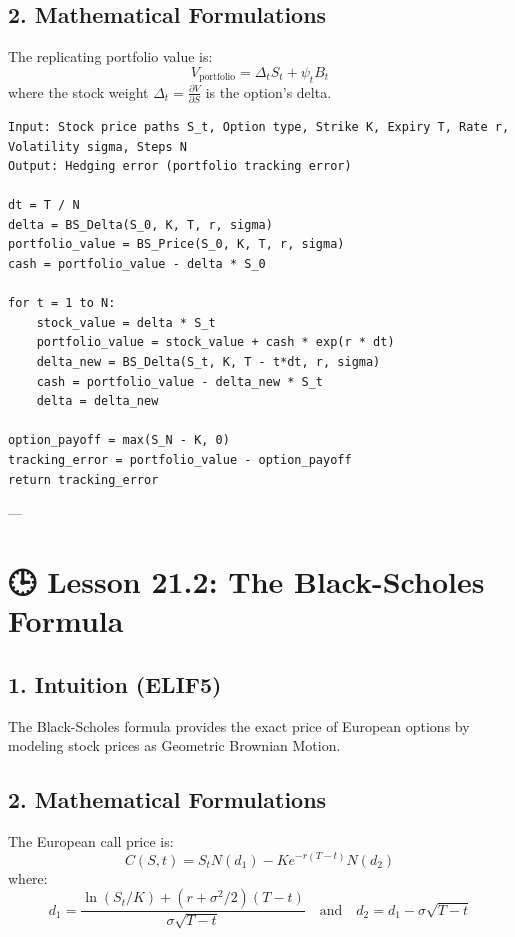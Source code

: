 \documentclass[11pt,oneside]{book}
\begin{document}
\subsection{2. Mathematical Formulations}
The replicating portfolio value is:
$$V_{\text{portfolio}} = \Delta_t S_t + \psi_t B_t$$
where the stock weight $\Delta_t = \frac{\partial V}{\partial S}$ is the option's delta.

\begin{tcolorbox}[colback=white,colframe=black,boxrule=0.6pt,arc=0mm,title=Delta Hedging Strategy]
\begin{verbatim}
Input: Stock price paths S_t, Option type, Strike K, Expiry T, Rate r, Volatility sigma, Steps N
Output: Hedging error (portfolio tracking error)

dt = T / N
delta = BS_Delta(S_0, K, T, r, sigma)
portfolio_value = BS_Price(S_0, K, T, r, sigma)
cash = portfolio_value - delta * S_0

for t = 1 to N:
    stock_value = delta * S_t
    portfolio_value = stock_value + cash * exp(r * dt)
    delta_new = BS_Delta(S_t, K, T - t*dt, r, sigma)
    cash = portfolio_value - delta_new * S_t
    delta = delta_new
    
option_payoff = max(S_N - K, 0)
tracking_error = portfolio_value - option_payoff
return tracking_error
\end{verbatim}
\end{tcolorbox}

---

\section{🕒 Lesson 21.2: The Black-Scholes Formula}

\subsection{1. Intuition (ELIF5)}
The Black-Scholes formula provides the exact price of European options by modeling stock prices as Geometric Brownian Motion.

\subsection{2. Mathematical Formulations}
The European call price is:
$$C(S, t) = S_t N(d_1) - K e^{-r(T-t)} N(d_2)$$
where:
$$d_1 = \frac{\ln(S_t/K) + \left(r + \sigma^2/2\right)(T-t)}{\sigma\sqrt{T-t}} \quad \text{and} \quad d_2 = d_1 - \sigma\sqrt{T-t}$$
\end{document}
